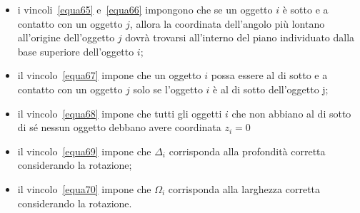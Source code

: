 \begin{itemize}
	\item i vincoli~\eqref{equa65} e~\eqref{equa66} impongono che se un oggetto $i$ è sotto e a contatto con un oggetto $j$, allora la coordinata dell'angolo più lontano all'origine dell'oggetto $j$ dovrà trovarsi all'interno del piano individuato dalla base superiore dell'oggetto $i$;
	\item il vincolo~\eqref{equa67} impone che un oggetto $i$ possa essere al di sotto e a contatto con un oggetto $j$ solo se l'oggetto $i$ è al di sotto dell'oggetto j;
	\item il vincolo~\eqref{equa68} impone che tutti gli oggetti $i$ che non abbiano al di sotto di sé nessun oggetto debbano avere coordinata $z_i=0$
	\item il vincolo~\eqref{equa69} impone che $\Delta_i$ corrisponda alla profondità corretta considerando la rotazione;
	\item il vincolo~\eqref{equa70} impone che $\Omega_i$ corrisponda alla larghezza corretta considerando la rotazione.
\end{itemize}

